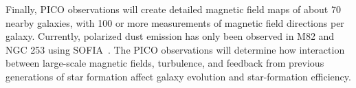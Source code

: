 \documentclass[PICOReport.tex]{subfiles}
\begin{document}
Finally, PICO observations will create detailed magnetic field maps of about 70 nearby galaxies, with 100 or more measurements of magnetic field directions per galaxy. Currently, polarized dust emission has only been observed in M82 and NGC 253 using SOFIA~\citep{Jonesetal}. The PICO observations will determine how interaction between large-scale magnetic fields, turbulence, and feedback from previous generations of star formation affect galaxy evolution and star-formation efficiency.
\end{document}
